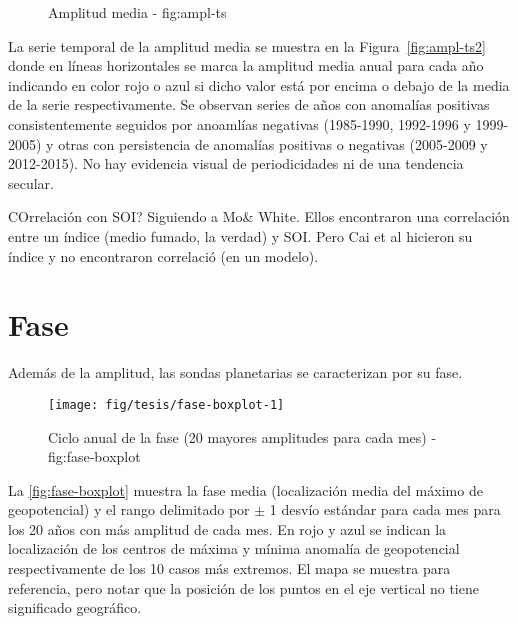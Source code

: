 \documentclass[spanish,a4paper,12p]{book}
\begin{document}
\begin{figure*}
\newline{}\caption{Amplitud media - fig:ampl-ts}\label{fig:ampl-ts}
\end{figure*}

La serie temporal de la amplitud media se muestra en la
Figura~\ref{fig:ampl-ts2} donde en líneas horizontales se marca la
amplitud media anual para cada año indicando en color rojo o azul si
dicho valor está por encima o debajo de la media de la serie
respectivamente. Se observan series de años con anomalías positivas
consistentemente seguidos por anoamlías negativas (1985-1990, 1992-1996
y 1999-2005) y otras con persistencia de anomalías positivas o negativas
(2005-2009 y 2012-2015). No hay evidencia visual de periodicidades ni de
una tendencia secular.

COrrelación con SOI? Siguiendo a Mo\& White. Ellos encontraron una
correlación entre un índice (medio fumado, la verdad) y SOI. Pero Cai et
al hicieron su índice y no encontraron correlació (en un modelo).

\section{Fase}\label{fase}

Además de la amplitud, las sondas planetarias se caracterizan por su
fase. 

\begin{landscape}\begin{figure}

{\centering \texttt{[image: fig/tesis/fase-boxplot-1]} 

}

\caption{Ciclo anual de la fase (20 mayores amplitudes para cada mes) - fig:fase-boxplot}\label{fig:fase-boxplot}
\end{figure}
\end{landscape}

La \autoref{fig:fase-boxplot} muestra la fase media (localización media
del máximo de geopotencial) y el rango delimitado por \(\pm\) 1 desvío
estándar para cada mes para los 20 años con más amplitud de cada mes. En
rojo y azul se indican la localización de los centros de máxima y mínima
anomalía de geopotencial respectivamente de los 10 casos más extremos.
El mapa se muestra para referencia, pero notar que la posición de los
puntos en el eje vertical no tiene significado geográfico.
\end{document}
